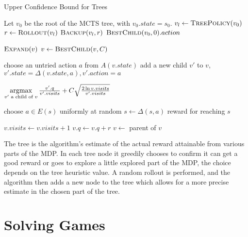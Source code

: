 \begin{algorithm}
    \caption{Upper Confidence Bound for Trees}
\label{alg:uct}
\begin{algorithmic}[1]
    \State Let $v_0$ be the root of the MCTS tree, with $v_0.state = s_0$.
        \State $v_l \gets \Call{TreePolicy}{v_0}$
        \State $r \gets \Call{Rollout}{v_l}$
        \State $\Call{Backup}{v_l, r}$
    \EndWhile
    \State \Return $\Call{BestChild}{v_0, 0}.action$
\EndFunction

            \State $\Call{Expand}{v}$
        \Else
            \State $v \gets \Call{BestChild}{v, C}$
        \EndIf
    \EndWhile
\EndFunction

    \State choose an untried action $a$ from $A(v.state)$
    \State add a new child $v'$ to $v$,
        $v'.state = \Delta(v.state, a),
        v'.action = a$
\EndFunction

    \State \Return
    $\operatorname*{\arg\!\max}\limits_{v' \text{ a child of } v}
    \frac{v'.q}{v'.visits} +
    C \sqrt{\frac{2\ln v.visits}{v'.visits}}$
\EndFunction

        \State choose $a \in E(s)$ uniformly at random
        \State $s \gets \Delta(s,a)$
    \EndWhile
    \Return reward for reaching $s$
\EndFunction

        \State $v.visits \gets v.visits + 1$
        \State $v.q \gets v.q + r$
        \State $v \gets$ parent of $v$
    \EndWhile
\EndFunction
\end{algorithmic}
\end{algorithm}

The tree is the algorithm's estimate of the actual reward attainable
from various parts of the MDP. In each tree node
it greedily chooses to confirm it can get a good reward or goes to explore
a little explored part of the MDP, the choice depends on the tree heuristic value.
A random rollout is performed, and the algorithm then adds a new node to
the tree which allows for a more precise estimate in the chosen part of
the tree.


\section{Solving Games}

